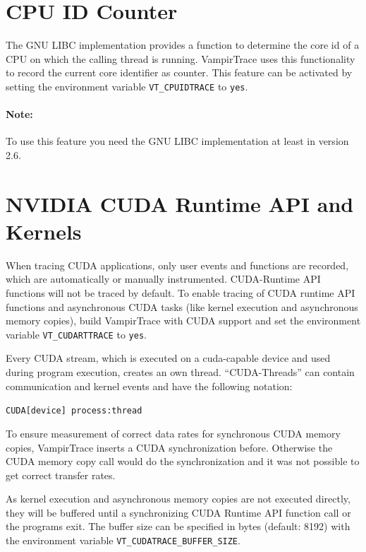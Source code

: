 \documentclass[a4paper,twoside,12pt,BCOR12mm]{scrbook}
\begin{document}
\section{CPU ID Counter}
\label{sec:cpu_id_counter}

  The GNU LIBC implementation provides a function to determine the core id of a CPU on which the calling
  thread is running. VampirTrace uses this functionality to record the current core identifier as
  counter. This feature can be activated by setting the environment variable
  \texttt{VT\_CPUIDTRACE} to \texttt{yes}.

  \paragraph{Note:}
  To use this feature you need the GNU LIBC implementation at least in version
  2.6.

\section{NVIDIA CUDA Runtime API and Kernels}
\label{sec:cuda}
  When tracing CUDA applications, only user events and functions are recorded,
  which are automatically or manually instrumented. CUDA-Runtime API functions
  will not be traced by default.
  To enable tracing of CUDA runtime API functions and asynchronous CUDA tasks 
  (like kernel execution and asynchronous memory copies), build VampirTrace 
  with CUDA support and set the environment variable
  \texttt{VT\_CUDARTTRACE} to \texttt{yes}.\smallskip

  \noindent Every CUDA stream, which is executed on a cuda-capable device and 
  used during program execution, creates an own thread. ``CUDA-Threads'' can 
  contain communication and kernel events and have the following notation:\smallskip

    \texttt{CUDA[device] process:thread}\smallskip

  \noindent To ensure measurement of correct data rates for synchronous CUDA 
  memory copies, VampirTrace inserts a CUDA synchronization before. 
  Otherwise the CUDA memory copy call would do the synchronization and it was 
  not possible to get correct transfer rates.\smallskip

  \noindent As kernel execution and asynchronous memory copies are not executed 
  directly, they will be buffered until a synchronizing CUDA Runtime API 
  function call or the programs exit. The buffer size can be specified in bytes 
  (default: 8192) with the environment variable 
  \texttt{VT\_CUDATRACE\_BUFFER\_SIZE}.\smallskip
\end{document}
